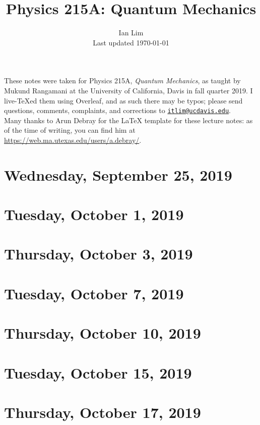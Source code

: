 \documentclass{../mynotes}
\begin{document}
\title{Physics 215A: Quantum Mechanics}
\author{Ian Lim\\ Last updated \today}
\maketitle
{\small\noindent These notes were taken for Physics 215A, \emph{Quantum Mechanics}, as taught by Mukund Rangamani at the University of California, Davis in fall quarter 2019. I live-\TeX ed them using Overleaf, and as such there may be typos; please send questions, comments, complaints, and corrections to 
\href{mailto:itlim@ucdavis.edu?subject=215A\%20Lecture\%20Notes}{\texttt{itlim@ucdavis.edu}}.\\
Many thanks to Arun Debray for the {\LaTeX} template for these lecture notes: as of the time of writing, you can find him at \url{https://web.ma.utexas.edu/users/a.debray/}.}

\tableofcontents

\section{Wednesday, September 25, 2019}
	

\section{Tuesday, October 1, 2019}
    

\section{Thursday, October 3, 2019}
    
\section{Tuesday, October 7, 2019}
    
    
\section{Thursday, October 10, 2019}
    
    
\section{Tuesday, October 15, 2019}
    
\section{Thursday, October 17, 2019}
    
\end{document}
